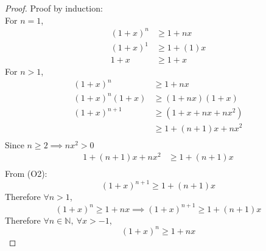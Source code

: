 \documentclass[]{article}
\newcommand{\N}{\mathbb{N}}
\begin{document}
\begin{proof}
    Proof by induction:\\
    For $n=1$,
    \begin{align*}
        (1+x)^n &\geq 1 + nx\\
        (1+x)^1 &\geq 1 + (1)x\\
        1+x &\geq 1 + x
    \end{align*}
    For $n > 1$,
    \begin{align*}
        (1+x)^n &\geq 1 + n x\\
        (1+x)^n (1+x) &\geq (1+nx) (1+x)\\
        (1+x)^{n+1} &\geq (1 + x + nx + nx^2)\\
            &\geq 1 + (n+1)x + nx^2\\
    \end{align*}
    Since $n \geq 2 \implies nx^2 > 0$
    \begin{align*}    
        1 + (n+1)x + nx^2 &\geq 1 + (n+1)x\\
    \end{align*}
    From (O2):
        $$(1+x)^{n+1} \geq 1 + (n+1)x$$
    Therefore $\forall n > 1$,
        $$(1+x)^n \geq 1 + nx \implies (1+x)^{n+1} \geq 1 + (n+1)x$$
    Therefore $\forall n\in\N, \ \forall x > -1$,
        $$(1+x)^n \geq 1 + nx$$
\end{proof}

\newpage
\end{document}
